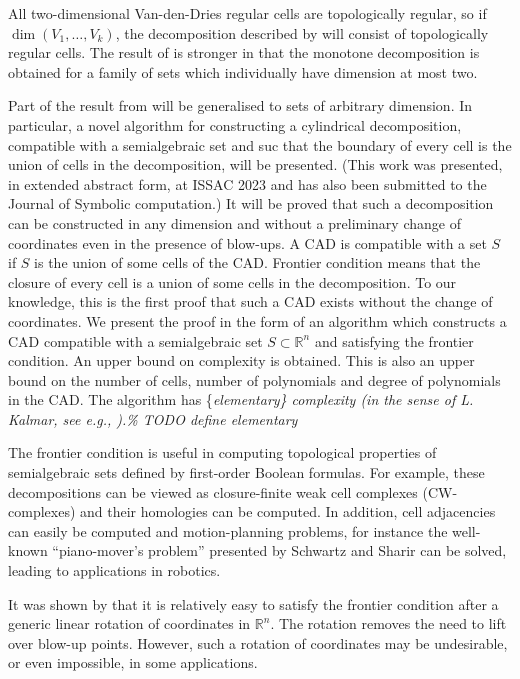 \documentclass[
]{book}
\theoremstyle{definition}
\theoremstyle{definition}
\theoremstyle{definition}
\theoremstyle{definition}
\theoremstyle{remark}
\begin{document}
All two-dimensional Van-den-Dries regular cells are topologically regular, so if \(\dim(V_1,\ldots,V_k)\), the decomposition described by \citet{vdd98} will consist of topologically regular cells. The result of \citet{bgv15} is stronger in that the monotone decomposition is obtained for a family of sets which individually have dimension at most two.

Part of the result from \citet{bgv15} will be generalised to sets of arbitrary dimension. In particular, a novel algorithm for constructing a cylindrical decomposition, compatible with a semialgebraic set and suc that the boundary of every cell is the union of cells in the decomposition, will be presented. (This work was presented, in extended abstract form, at ISSAC 2023 and has also been submitted to the Journal of Symbolic computation.)
It will be proved that such a decomposition can be constructed in any dimension and without a preliminary change of coordinates even in the presence of blow-ups. A CAD is compatible with a set \(S\) if \(S\) is the union of some cells of the CAD. Frontier condition means that the closure of every cell is a union of some cells in the decomposition.
To our knowledge, this is the first proof that such a CAD exists without the change of coordinates.
We present the proof in the form of an algorithm which constructs a CAD compatible with a semialgebraic set \(S \subset \mathbb{R}^n\) and satisfying the frontier condition.
An upper bound on complexity is obtained. This is also an upper bound on the number of cells, number of polynomials and degree of polynomials in the CAD. The algorithm has \{\em elementary\} complexity (in the sense of L. Kalmar, see e.g.,
\citep[\(\S 57\)]{kleene1952}).\% TODO define elementary

The frontier condition is useful in computing topological properties of semialgebraic sets defined by first-order Boolean formulas. For example, these decompositions can be viewed as closure-finite weak cell complexes (CW-complexes) and their homologies can be computed. In addition, cell adjacencies can easily be computed and motion-planning problems, for instance the well-known ``piano-mover's problem'' presented by Schwartz and Sharir can be solved, leading to applications in robotics.

It was shown by \citet{pianomovers1983} that it is relatively easy to satisfy the frontier condition after a generic linear rotation of coordinates in \(\mathbb{R}^n\). The rotation removes the need to lift over blow-up points. However, such a rotation of coordinates may be undesirable, or even impossible, in some applications.
\end{document}
